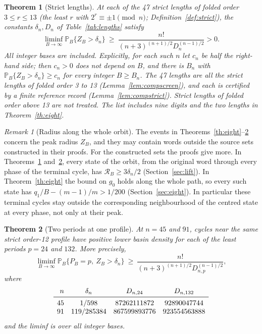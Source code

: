 \documentclass[11pt,reqno]{amsart}
\newtheorem{theorem}{Theorem}
\theoremstyle{remark}
\newtheorem*{remark}{Remark}
\newcommand{\PP}{\mathbb P}
\begin{document}
\begin{theorem}[Strict lengths]\label{th:strict}
At each of the 47 strict lengths of folded order \(3\le r\le13\)
(the least \(r\) with \(2^r\equiv\pm1\pmod n\); Definition~\ref{def:strict}), the constants \(\delta_n,D_n\) of
Table~\ref{tab:lengths} satisfy
\[
  \liminf_{B\to\infty}\PP_B\{Z_B>\delta_n\}
      \ \ge\ \frac{n!}{(n+3)^{(n+1)/2}D_n^{(n-1)/2}}>0 .
\]
All integer bases are included. Explicitly, for each such \(n\) let
\(c_n\) be half the right-hand side; then \(c_n>0\) does not depend
on \(B\), and there is \(B_n\) with \(\PP_B\{Z_B>\delta_n\}\ge c_n\)
for every integer \(B\ge B_n\).
The 47 lengths are all the strict lengths of folded order 3 to 13
(Lemma~\ref{lem:compscreen}), and each is certified by a finite
reference record (Lemma~\ref{lem:compstrict}). Strict lengths of
folded order above 13 are not treated. The list includes nine digits
and the two lengths in Theorem~\ref{th:eight}.
\end{theorem}

\begin{remark}[Radius along the whole orbit]
The events in Theorems~\ref{th:eight}--\ref{th:coexist} concern the
peak radius \(Z_B\), and they may contain words outside the source
sets constructed in their proofs. For the constructed sets the proofs
give more. In Theorems~\ref{th:strict} and~\ref{th:coexist}, every
state of the orbit, from the original word through every phase of
the terminal cycle, has \(\mathcal R_B\ge3\delta_n/2\)
(Section~\ref{sec:lift}). In Theorem~\ref{th:eight} the bound on
\(g_0\) holds along the whole path, so every such state has
\(q_1/B-(m-1)/m>1/200\) (Section~\ref{sec:eight}). In particular
these terminal cycles stay outside the corresponding neighbourhood of
the centred state at every phase, not only at their peak.
\end{remark}

\begin{theorem}[Two periods at one profile]\label{th:coexist}
At \(n=45\) and \(91\), cycles near the same strict order-12 profile
have positive lower basin density for each of the least periods
\(p=24\) and \(132\). More precisely,
\[
 \liminf_{B\to\infty}\PP_B\{P_B=p,\ Z_B>\delta_n\}
  \ \ge\ \frac{n!}{(n+3)^{(n+1)/2}D_{n,p}^{(n-1)/2}},
\]
where
\[
\begin{array}{rccc}
 n & \delta_n & D_{n,24} & D_{n,132} \\
 \midrule
 45 & 1/598       & 87262111872  & 92890047744 \\
 91 & 119/285384  & 867599893776 & 923554563888
\end{array}
\]
and the liminf is over all integer bases.
\end{theorem}
\end{document}
